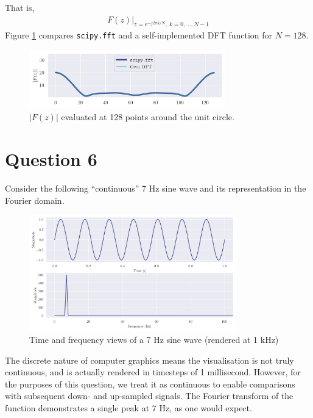 \documentclass[a4paper, 11pt]{article}
\begin{document}
\begin{enumerate}[label=\alph*)]
    That is,
    \begin{align*}
        F(z) \big|_{z=e^{-j2\pi k/N},\ k=0,\ldots,N-1}
    \end{align*}
    Figure \ref{fig:q5b_dftsample} compares \texttt{scipy.fft} and a
    self-implemented DFT function for $N=128$.
    \begin{figure}[ht]
        \centering
        \includegraphics[width=0.76\textwidth]{images/q5b_dftsample.png}
        \caption{$|F(z)|$ evaluated at 128 points around the unit circle.}
        \label{fig:q5b_dftsample}
    \end{figure}

\end{enumerate}

\newpage
\section*{Question 6}

Consider the following ``continuous'' 7 Hz sine wave and its representation in
the Fourier domain.
\begin{figure}[ht]
    \centering
    \includegraphics[width=0.8\textwidth]{images/q6_sine7hz.png}
    \caption{Time and frequency views of a 7 Hz sine wave (rendered at
        1 kHz)}
    \label{fig:q6_sine7hz}
\end{figure}

The discrete nature of computer graphics means the visualisation is not truly
continuous, and is actually rendered in timesteps of 1 millisecond. However, for
the purposes of this question, we treat it as continuous to enable comparisons
with subsequent down- and up-sampled signals. The Fourier transform of the
function demonstrates a single peak at 7 Hz, as one would expect.
\end{document}

